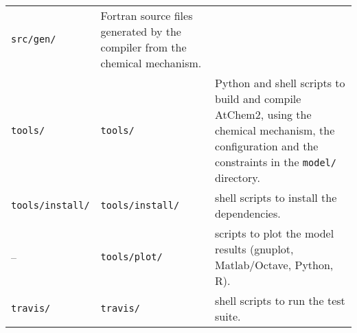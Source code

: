 \begin{longtable}[]{@{}lll@{}}
\begin{minipage}[t]{0.24\columnwidth}
\texttt{src/gen/}\strut
\end{minipage} & \begin{minipage}[t]{0.48\columnwidth}\raggedright
Fortran source files generated by the compiler from the chemical
mechanism.\strut
\end{minipage}\tabularnewline
\begin{minipage}[t]{0.20\columnwidth}\raggedright
\texttt{tools/}\strut
\end{minipage} & \begin{minipage}[t]{0.24\columnwidth}\raggedright
\texttt{tools/}\strut
\end{minipage} & \begin{minipage}[t]{0.48\columnwidth}\raggedright
Python and shell scripts to build and compile AtChem2, using the
chemical mechanism, the configuration and the constraints in the
\texttt{model/} directory.\strut
\end{minipage}\tabularnewline
\begin{minipage}[t]{0.20\columnwidth}\raggedright
\texttt{tools/install/}\strut
\end{minipage} & \begin{minipage}[t]{0.24\columnwidth}\raggedright
\texttt{tools/install/}\strut
\end{minipage} & \begin{minipage}[t]{0.48\columnwidth}\raggedright
shell scripts to install the dependencies.\strut
\end{minipage}\tabularnewline
\begin{minipage}[t]{0.20\columnwidth}\raggedright
--\strut
\end{minipage} & \begin{minipage}[t]{0.24\columnwidth}\raggedright
\texttt{tools/plot/}\strut
\end{minipage} & \begin{minipage}[t]{0.48\columnwidth}\raggedright
scripts to plot the model results (gnuplot, Matlab/Octave, Python,
R).\strut
\end{minipage}\tabularnewline
\begin{minipage}[t]{0.20\columnwidth}\raggedright
\texttt{travis/}\strut
\end{minipage} & \begin{minipage}[t]{0.24\columnwidth}\raggedright
\texttt{travis/}\strut
\end{minipage} & \begin{minipage}[t]{0.48\columnwidth}\raggedright
shell scripts to run the test suite.\strut
\end{minipage}\tabularnewline

\end{longtable}
